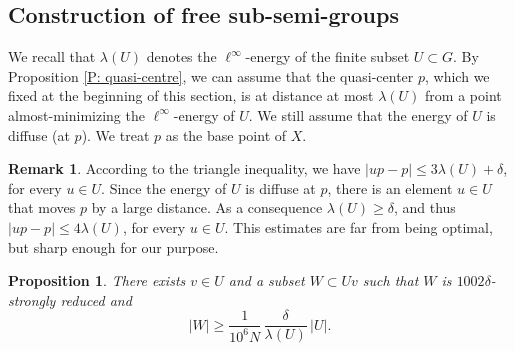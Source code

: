 \documentclass[11pt]{article}
\theoremstyle{plain}
\newtheorem{prop}[thm]{Proposition}
\theoremstyle{definition}
\newtheorem{rem}[thm]{Remark}
\begin{document}
\subsection{Construction of free sub-semi-groups}

We recall that $\lambda(U)$ denotes the $\ell^\infty$\nobreakdash-energy of the finite subset $U \subset G$.
By Proposition \ref{P: quasi-centre}, we can assume that the quasi-center $p$, which we fixed at the beginning of this section, is at distance at most $\lambda (U)$ from a point almost-minimizing the $\ell^\infty$-energy of $U$.
We still assume that the energy of $U$ is diffuse (at $p$).
We treat $p$ as the base point of $X$.

\begin{rem}
According to the triangle inequality, we have $|up - p| \leq 3\lambda(U) + \delta$, for every $u \in U$.
Since the energy of $U$ is diffuse at $p$, there is an element $u \in U$ that moves $p$ by a large distance.
As a consequence $\lambda(U) \geq \delta$, and thus $|up - p| \leq 4\lambda(U)$, for every $u \in U$.
This estimates are far from being optimal, but sharp enough for our purpose.
\end{rem}

\begin{prop}
\label{P: construction semi-group}
There exists $v \in U$ and a subset $W \subset Uv$ such that $W$ is $1002\delta$-strongly reduced and
\begin{equation*}
|W| \geq \frac 1{10^6N}\,\frac \delta{\lambda(U)}\, |U|.
\end{equation*}
\end{prop}
\end{document}
